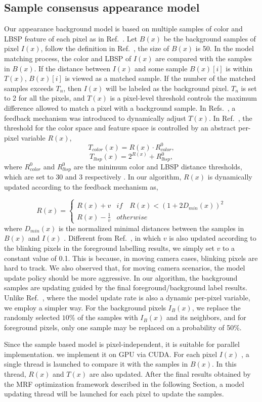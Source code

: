 \subsection{Sample consensus appearance model}
\label {sec:3.3}
Our appearance background model is based on multiple samples of color and LBSP feature of each pixel as in Ref.~. Let $B(x)$ be the background samples of pixel $I(x)$, follow the definition in Ref.~, the size of $B(x)$ is 50. In the model matching process, the color and LBSP of $I(x)$ are compared with the samples in $B(x)$. If the distance between $I(x)$ and some sample $B(x)[i]$ is within  $T(x)$, $B(x)[i]$ is viewed as a matched sample. If the number of the matched samples exceeds $ T_{n}$, then $I(x)$ will be labeled as the background pixel. $T_{n}$ is set to 2 for all the pixels, and $T(x)$ is a pixel-level threshold controls the maximum difference allowed to match a pixel with a background sample. In Refs.~, a feedback mechanism was introduced to dynamically adjust $T(x)$. In Ref.~, the threshold for the color space and feature space is controlled by an abstract per-pixel variable $R(x)$,
$$T_{color}(x) = R(x) \cdot R^{0}_{color},$$
$$T_{lbsp}(x) = 2^{R(x)} + R^{0}_{lbsp},$$
where $R^{0}_{color}$ and $R^{0}_{lbsp}$ are the minimum color and LBSP distance thresholds, which are set to 30 and 3 respectively \cite{subsenseTIP}. In our algorithm, $R(x)$ is dynamically updated according to the feedback mechanism as,

$$ R(x) = \begin{cases}  R(x)+v & if \quad {R(x)<(1+2D_{min}(x))}^{2} \\  R(x) - \frac{1 }{v } & otherwise \end{cases}$$
where $D_{min}(x)$ is the normalized minimal distances between the samples in $B(x)$ and $I(x)$ . Different from Ref.~, in which $v$ is also updated according to the blinking pixels in the foreground labelling results, we simply set $v$ to a constant value of 0.1. This is because, in moving camera cases, blinking pixels are hard to track. We also observed that, for moving camera scenarios, the model update policy should be more aggressive. In our algorithm, the background samples are updating guided by the final foreground/background label results. Unlike Ref.~, where the model update rate is also a dynamic per-pixel  variable, we employ a simpler way. For the background pixels $I_{B}(x)$, we replace the randomly selected $10\%$ of the samples with $I_{B}(x)$ and its neighbors, and for foreground pixels, only one sample may be replaced on a probability of 50\%. \par
Since the sample based model is pixel-independent, it is suitable for parallel implementation. we implement it on GPU via CUDA. For each pixel $I(x)$ , a single thread is launched to compare it with the samples in $B(x)$. In this thread, $R(x)$ and $T(x)$ are also updated. After the final results obtained by the MRF optimization framework described in the following Section, a model updating thread will be launched for each pixel to update the samples.

